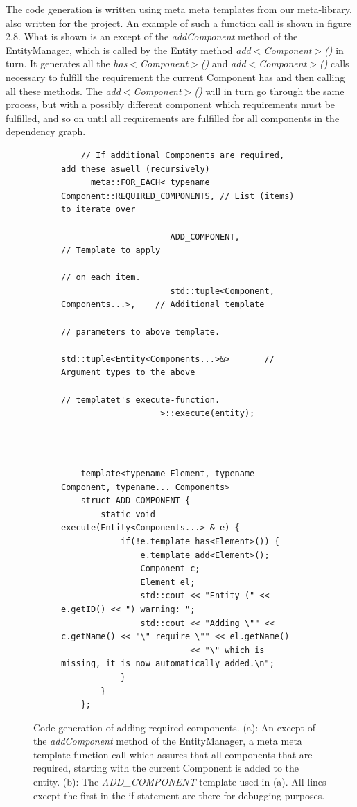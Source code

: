 The code generation is written using meta meta templates from our meta-library, also written for the project. An example of such a function call is shown in figure 2.8. What is shown is an except of the \textit{addComponent} method of the EntityManager, which is called by the Entity method \textit{add$<$Component$>$()} in turn. It generates all the \textit{has$<$Component$>$()} and \textit{add$<$Component$>$()} calls necessary to fulfill the requirement the current Component has and then calling all these methods. The \textit{add$<$Component$>$()} will in turn go through the same process, but with a possibly different component which requirements must be fulfilled, and so on until all requirements are fulfilled for all components in the dependency graph.
\begin{figure}[H]
\begin{subfigure}{\textwidth}
  \begin{lstlisting}
    // If additional Components are required, add these aswell (recursively)
      meta::FOR_EACH< typename Component::REQUIRED_COMPONENTS, // List (items) to iterate over
      
                      ADD_COMPONENT,                           // Template to apply
                                                               // on each item.
                      std::tuple<Component, Components...>,    // Additional template
                                                               // parameters to above template.
                      std::tuple<Entity<Components...>&>       // Argument types to the above
                                                               // templatet's execute-function.
                    >::execute(entity);
  
  \end{lstlisting}
  \label{fig:ADD_COMPONENT_FOREACH}
  \caption{}
\end{subfigure}%
\\
\begin{subfigure}{\textwidth}
  \begin{lstlisting}
    template<typename Element, typename Component, typename... Components>
    struct ADD_COMPONENT {
        static void execute(Entity<Components...> & e) {
            if(!e.template has<Element>()) {
                e.template add<Element>();
                Component c;
                Element el;
                std::cout << "Entity (" << e.getID() << ") warning: ";
                std::cout << "Adding \"" << c.getName() << "\" require \"" << el.getName()
                          << "\" which is missing, it is now automatically added.\n";
            }
        }
    };  
  \end{lstlisting}
  \label{fig:ADD_COMPONENT}
  \caption{}
\end{subfigure}
  \label{fig:codeCreationExample}
  \caption{Code generation of adding required components. (a): An except of the \textit{addComponent} method of the EntityManager, a meta meta template function call which assures that all components that are required, starting with the current Component is added to the entity. (b): The \textit{ADD\_COMPONENT} template used in (a). All lines except the first in the if-statement are there for debugging purposes.}
\end{figure}
